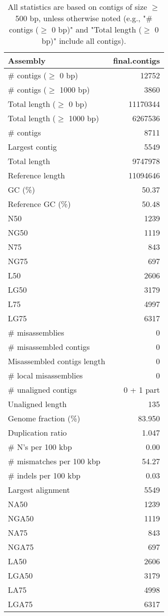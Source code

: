 \documentclass[12pt,a4paper]{article}
\begin{document}
\begin{table}[ht]
\begin{center}
\caption{All statistics are based on contigs of size $\geq$ 500 bp, unless otherwise noted (e.g., "\# contigs ($\geq$ 0 bp)" and "Total length ($\geq$ 0 bp)" include all contigs).}
\begin{tabular}{|l*{1}{|r}|}
\hline
Assembly & final.contigs \\ \hline
\# contigs ($\geq$ 0 bp) & 12752 \\ \hline
\# contigs ($\geq$ 1000 bp) & 3860 \\ \hline
Total length ($\geq$ 0 bp) & 11170344 \\ \hline
Total length ($\geq$ 1000 bp) & 6267536 \\ \hline
\# contigs & 8711 \\ \hline
Largest contig & 5549 \\ \hline
Total length & 9747978 \\ \hline
Reference length & 11094646 \\ \hline
GC (\%) & 50.37 \\ \hline
Reference GC (\%) & 50.48 \\ \hline
N50 & 1239 \\ \hline
NG50 & 1119 \\ \hline
N75 & 843 \\ \hline
NG75 & 697 \\ \hline
L50 & 2606 \\ \hline
LG50 & 3179 \\ \hline
L75 & 4997 \\ \hline
LG75 & 6317 \\ \hline
\# misassemblies & 0 \\ \hline
\# misassembled contigs & 0 \\ \hline
Misassembled contigs length & 0 \\ \hline
\# local misassemblies & 0 \\ \hline
\# unaligned contigs & 0 + 1 part \\ \hline
Unaligned length & 135 \\ \hline
Genome fraction (\%) & 83.950 \\ \hline
Duplication ratio & 1.047 \\ \hline
\# N's per 100 kbp & 0.00 \\ \hline
\# mismatches per 100 kbp & 54.27 \\ \hline
\# indels per 100 kbp & 0.03 \\ \hline
Largest alignment & 5549 \\ \hline
NA50 & 1239 \\ \hline
NGA50 & 1119 \\ \hline
NA75 & 843 \\ \hline
NGA75 & 697 \\ \hline
LA50 & 2606 \\ \hline
LGA50 & 3179 \\ \hline
LA75 & 4998 \\ \hline
LGA75 & 6317 \\ \hline
\end{tabular}
\end{center}
\end{table}
\end{document}
